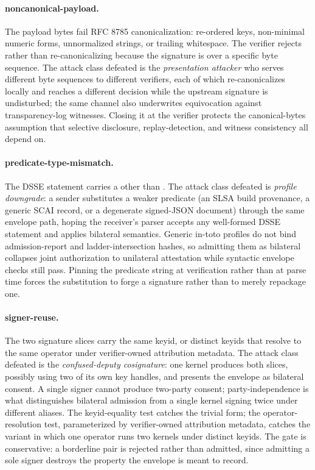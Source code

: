 \paragraph{noncanonical-payload.} The payload bytes fail RFC 8785 canonicalization: re-ordered keys, non-minimal numeric forms, unnormalized strings, or trailing whitespace. The verifier rejects rather than re-canonicalizing because the signature is over a specific byte sequence. The attack class defeated is the \emph{presentation attacker} who serves different byte sequences to different verifiers, each of which re-canonicalizes locally and reaches a different decision while the upstream signature is undisturbed; the same channel also underwrites equivocation against transparency-log witnesses. Closing it at the verifier protects the canonical-bytes assumption that selective disclosure, replay-detection, and witness consistency all depend on.

\paragraph{predicate-type-mismatch.} The DSSE statement carries a  other than . The attack class defeated is \emph{profile downgrade}: a sender substitutes a weaker predicate (an SLSA build provenance, a generic SCAI record, or a degenerate signed-JSON document) through the same envelope path, hoping the receiver's parser accepts any well-formed DSSE statement and applies bilateral semantics. Generic in-toto profiles do not bind admission-report and ladder-intersection hashes, so admitting them as bilateral collapses joint authorization to unilateral attestation while syntactic envelope checks still pass. Pinning the predicate string at verification rather than at parse time forces the substitution to forge a signature rather than to merely repackage one.

\paragraph{signer-reuse.} The two signature slices carry the same keyid, or distinct keyids that resolve to the same operator under verifier-owned attribution metadata. The attack class defeated is the \emph{confused-deputy cosignature}: one kernel produces both slices, possibly using two of its own key handles, and presents the envelope as bilateral consent. A single signer cannot produce two-party consent; party-independence is what distinguishes bilateral admission from a single kernel signing twice under different aliases. The keyid-equality test catches the trivial form; the operator-resolution test, parameterized by verifier-owned attribution metadata, catches the variant in which one operator runs two kernels under distinct keyids. The gate is conservative: a borderline pair is rejected rather than admitted, since admitting a sole signer destroys the property the envelope is meant to record.


